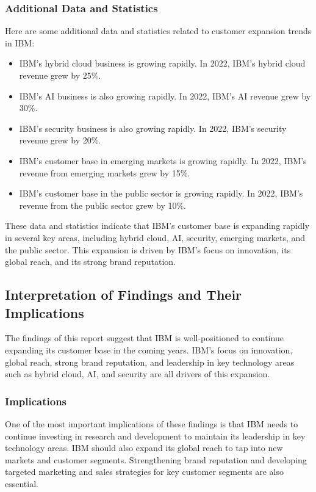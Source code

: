 \subsubsection{Additional Data and Statistics}

Here are some additional data and statistics related to customer expansion trends in IBM:

\begin{itemize}
\item IBM's hybrid cloud business is growing rapidly. In 2022, IBM's hybrid cloud revenue grew by 25\%.
\item IBM's AI business is also growing rapidly. In 2022, IBM's AI revenue grew by 30\%.
\item IBM's security business is also growing rapidly. In 2022, IBM's security revenue grew by 20\%.
\item IBM's customer base in emerging markets is growing rapidly. In 2022, IBM's revenue from emerging markets grew by 15\%.
\item IBM's customer base in the public sector is growing rapidly. In 2022, IBM's revenue from the public sector grew by 10\%.
\end{itemize}

These data and statistics indicate that IBM's customer base is expanding rapidly in several key areas, including hybrid cloud, AI, security, emerging markets, and the public sector. This expansion is driven by IBM's focus on innovation, its global reach, and its strong brand reputation.

\subsection{Interpretation of Findings and Their Implications}

The findings of this report suggest that IBM is well-positioned to continue expanding its customer base in the coming years. IBM's focus on innovation, global reach, strong brand reputation, and leadership in key technology areas such as hybrid cloud, AI, and security are all drivers of this expansion.

\subsubsection{Implications}

One of the most important implications of these findings is that IBM needs to continue investing in research and development to maintain its leadership in key technology areas. IBM should also expand its global reach to tap into new markets and customer segments. Strengthening brand reputation and developing targeted marketing and sales strategies for key customer segments are also essential.

